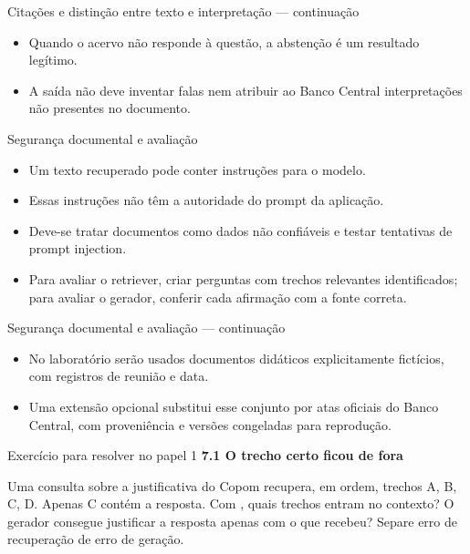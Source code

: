 \documentclass[10pt,aspectratio=169]{beamer}
\begin{document}
\begin{frame}[t]{Citações e distinção entre texto e interpretação — continuação}
\small
\begin{itemize}
\item Quando o acervo não responde à questão, a abstenção é um resultado legítimo.
\item A saída não deve inventar falas nem atribuir ao Banco Central interpretações não presentes no documento.
\end{itemize}
\end{frame}

\begin{frame}[t]{Segurança documental e avaliação}
\small
\begin{itemize}
\item Um texto recuperado pode conter instruções para o modelo.
\item Essas instruções não têm a autoridade do prompt da aplicação.
\item Deve-se tratar documentos como dados não confiáveis e testar tentativas de prompt injection.
\item Para avaliar o retriever, criar perguntas com trechos relevantes identificados; para avaliar o gerador, conferir cada afirmação com a fonte correta.
\end{itemize}
\end{frame}

\begin{frame}[t]{Segurança documental e avaliação — continuação}
\small
\begin{itemize}
\item No laboratório serão usados documentos didáticos explicitamente fictícios, com registros de reunião e data.
\item Uma extensão opcional substitui esse conjunto por atas oficiais do Banco Central, com proveniência e versões congeladas para reprodução.
\end{itemize}
\end{frame}

\begin{frame}[t]{Exercício para resolver no papel 1}
\small
\small\textbf{7.1 O trecho certo ficou de fora}\par\vspace{4mm}Uma consulta sobre a justificativa do Copom recupera, em ordem, trechos A, B, C, D. Apenas C contém a resposta. Com , quais trechos entram no contexto? O gerador consegue justificar a resposta apenas com o que recebeu? Separe erro de recuperação de erro de geração.
\end{frame}
\end{document}
